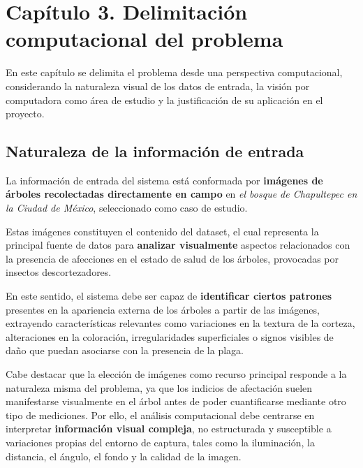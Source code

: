 \newpage

\section*{Capítulo 3. Delimitación computacional del problema}
\setcounter{section}{3}
\setcounter{subsection}{0}

En este capítulo se delimita el problema desde una perspectiva computacional, considerando la naturaleza visual de los datos de entrada, la visión por computadora como área de estudio y la justificación de su aplicación en el proyecto. 

\subsection{Naturaleza de la información de entrada}

La información de entrada del sistema está conformada por \textbf{imágenes de árboles recolectadas directamente en campo} en \textit{el bosque de Chapultepec en la Ciudad de México}, seleccionado como caso de estudio.

Estas imágenes constituyen el contenido del dataset, el cual representa la principal fuente de datos para \textbf{analizar visualmente }aspectos relacionados con la presencia de afecciones en el estado de salud de los árboles, provocadas por insectos descortezadores.

En este sentido, el sistema debe ser capaz de \textbf{identificar ciertos patrones} presentes en la apariencia externa de los árboles a partir de las imágenes, extrayendo características relevantes como variaciones en la textura de la corteza, alteraciones en la coloración, irregularidades superficiales o signos visibles de daño que puedan asociarse con la presencia de la plaga.

Cabe destacar que la elección de imágenes como recurso principal responde a la naturaleza misma del problema, ya que los indicios de afectación suelen manifestarse visualmente en el árbol antes de poder cuantificarse mediante otro tipo de mediciones. Por ello, el análisis computacional debe centrarse en interpretar \textbf{información visual compleja}, no estructurada y susceptible a variaciones propias del entorno de captura, tales como la iluminación, la distancia, el ángulo, el fondo y la calidad de la imagen.
